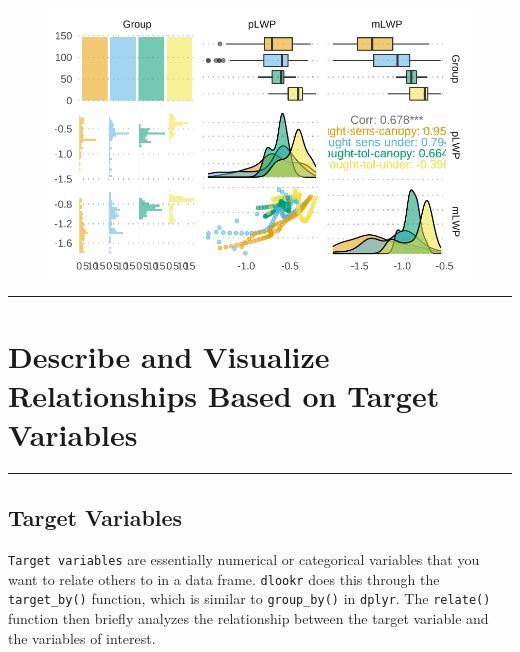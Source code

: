 \documentclass[
  letterpaper,
  DIV=11,
  numbers=noendperiod]{scrreprt}
\begin{document}
\begin{figure}[H]

{\centering \includegraphics{./CorrelateLikeDataMaster_files/figure-pdf/unnamed-chunk-6-1.pdf}

}

\end{figure}

\begin{center}\rule{0.5\linewidth}{0.5pt}\end{center}

\hypertarget{describe-and-visualize-relationships-based-on-target-variables}{%
\section{Describe and Visualize Relationships Based on Target
Variables}\label{describe-and-visualize-relationships-based-on-target-variables}}

\begin{center}\rule{0.5\linewidth}{0.5pt}\end{center}

\hypertarget{target-variables}{%
\subsection{Target Variables}\label{target-variables}}

\texttt{Target\ variables} are essentially numerical or categorical
variables that you want to relate others to in a data frame.
\texttt{dlookr} does this through the \texttt{target\_by()} function,
which is similar to \texttt{group\_by()} in \texttt{dplyr}. The
\texttt{relate()} function then briefly analyzes the relationship
between the target variable and the variables of interest.
\end{document}

